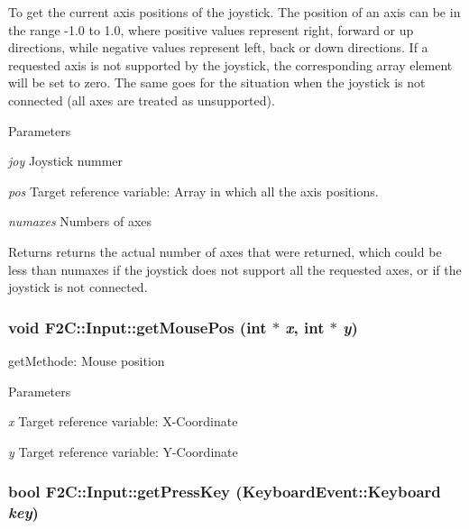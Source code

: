 To get the current axis positions of the joystick. The position of an axis can be in the range -\/1.0 to 1.0, where positive values represent right, forward or up directions, while negative values represent left, back or down directions. If a requested axis is not supported by the joystick, the corresponding array element will be set to zero. The same goes for the situation when the joystick is not connected (all axes are treated as unsupported). 
\begin{DoxyParams}{Parameters}
\item[{\em joy}]Joystick nummer \item[{\em pos}]Target reference variable: Array in which all the axis positions. \item[{\em numaxes}]Numbers of axes \end{DoxyParams}
\begin{DoxyReturn}{Returns}
returns the actual number of axes that were returned, which could be less than numaxes if the joystick does not support all the requested axes, or if the joystick is not connected. 
\end{DoxyReturn}
\hypertarget{class_f2_c_1_1_input_afe44e50d55a10eac43f4d114d01fcc9e}{
\subsubsection[{getMousePos}]{\setlength{\rightskip}{0pt plus 5cm}void F2C::Input::getMousePos (int $\ast$ {\em x}, \/  int $\ast$ {\em y})}}
\label{class_f2_c_1_1_input_afe44e50d55a10eac43f4d114d01fcc9e}


getMethode: Mouse position 
\begin{DoxyParams}{Parameters}
\item[{\em x}]Target reference variable: X-\/Coordinate \item[{\em y}]Target reference variable: Y-\/Coordinate \end{DoxyParams}
\hypertarget{class_f2_c_1_1_input_a5684e139903d71e9a7a0ac6d209895a1}{
\subsubsection[{getPressKey}]{\setlength{\rightskip}{0pt plus 5cm}bool F2C::Input::getPressKey ({\bf KeyboardEvent::Keyboard} {\em key})}}
\label{class_f2_c_1_1_input_a5684e139903d71e9a7a0ac6d209895a1}


